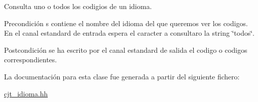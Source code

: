 Consulta uno o todos los codigios de un idioma. 

\begin{DoxyPrecond}{Precondición}
s contiene el nombre del idioma del que queremos ver los codigos. En el canal estandard de entrada espera el caracter a consultaro la string \char`\"{}todos\char`\"{}. 
\end{DoxyPrecond}
\begin{DoxyPostcond}{Postcondición}
se ha escrito por el canal estandard de salida el codigo o codigos correspondientes. 
\end{DoxyPostcond}


La documentación para esta clase fue generada a partir del siguiente fichero\+:\begin{DoxyCompactItemize}
\item 
\hyperlink{cjt__idioma_8hh}{cjt\+\_\+idioma.\+hh}\end{DoxyCompactItemize}

